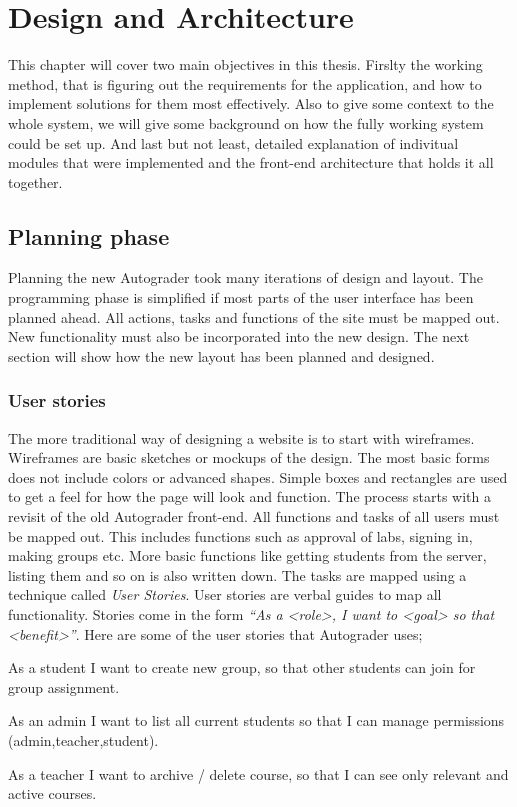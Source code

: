 \chapter{Design and Architecture}
This chapter will cover two main objectives in this thesis. Firslty the working method, that is figuring out the requirements for the application, and how to implement solutions for them most effectively. Also to give some context to the whole system, we will give some background on how the fully working system could be set up. And last but not least, detailed explanation of indivitual modules that were implemented and the front-end architecture that holds it all together.

\section{Planning phase}
Planning the new Autograder took many iterations of design and layout. The programming phase is simplified if most parts of the user interface has been planned ahead. All actions, tasks and functions of the site must be mapped out. New functionality must also be incorporated into the new design. The next section will show how the new layout has been planned and designed.


\subsection{User stories}
The more traditional way of designing a website is to start with wireframes. Wireframes are basic sketches or mockups of the design. The most basic forms does not include colors or advanced shapes. Simple boxes and rectangles are used to get a feel for how the page will look and function. The process starts with a revisit of the old Autograder front-end. All functions and tasks of all users must be mapped out. This includes functions such as approval of labs, signing in, making groups etc. More basic functions like getting students from the server, listing them and so on is also written down. The tasks are mapped using a technique called \emph{User Stories}. User stories are verbal guides to map all functionality. Stories come in the form \emph{``As a <role>, I want to <goal> so that <benefit>''}. Here are some of the user stories that Autograder uses;

\begin{itemize*}
\item As a student I want to create new group, so that other students can join for group assignment.
\item As an admin I want to list all current students so that I can manage permissions (admin,teacher,student).
\item As a teacher I want to archive / delete course, so that I can see only relevant and active courses.
\end{itemize*}

